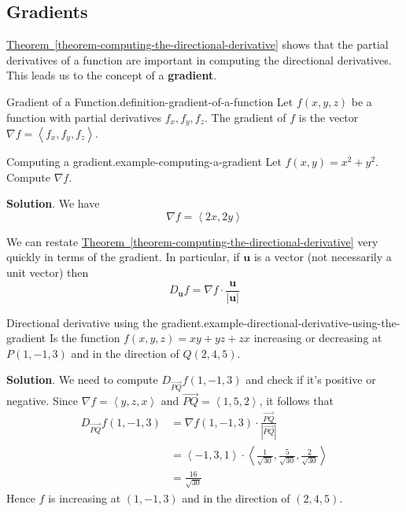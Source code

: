 \documentclass[10pt,]{book}
\newcommand{\terminology}[1]{\textbf{#1}}
\numberwithin{equation}{section}
\newcommand{\vv}[1]{\mathbf{#1}}
\newcommand{\grad}{\nabla}
\newcommand{\dotprod}[1]{\left\langle #1 \right\rangle}
\begin{document}
\subsection[{Gradients}]{Gradients}\label{subsection-gradients}
\hypertarget{p-1404}{}%
\hyperref[theorem-computing-the-directional-derivative]{Theorem~\ref{theorem-computing-the-directional-derivative}} shows that the partial derivatives of a function are important in computing the directional derivatives. This leads us to the concept of a \terminology{gradient}.%
\begin{definition}{Gradient of a Function.}{definition-gradient-of-a-function}%
\hypertarget{p-1405}{}%
Let \(f(x,y,z)\) be a function with partial derivatives \(f_{x}, f_{y}, f_{z}\). The gradient of \(f\) is the vector \(\grad f = \dotprod{f_{x}, f_{y}, f_{z}}\).%
\end{definition}
\begin{example}{Computing a gradient.}{example-computing-a-gradient}%
\hypertarget{p-1406}{}%
Let \(f(x,y) = x^{2} + y^{2}\). Compute \(\grad f\).%
\par\smallskip%
\noindent\textbf{Solution}.\hypertarget{solution-228}{}\quad%
\hypertarget{p-1407}{}%
We have%
\begin{equation*}
\grad f = \dotprod{2x, 2y}
\end{equation*}
%
\end{example}
\hypertarget{p-1408}{}%
We can restate \hyperref[theorem-computing-the-directional-derivative]{Theorem~\ref{theorem-computing-the-directional-derivative}} very quickly in terms of the gradient. In particular, if \(\vv{u}\) is a vector (not necessarily a unit vector) then%
\begin{equation}
D_{\vv{u}}f = \grad f\cdot \frac{\vv{u}}{|\vv{u}|}\label{equation-directional-derivative-gradient}
\end{equation}
%
\begin{example}{Directional derivative using the gradient.}{example-directional-derivative-using-the-gradient}%
\hypertarget{p-1409}{}%
Is the function \(f(x,y,z) = xy + yz + zx\) increasing or decreasing at \(P(1,-1,3)\) and in the direction of \(Q(2,4,5)\).%
\par\smallskip%
\noindent\textbf{Solution}.\hypertarget{solution-229}{}\quad%
\hypertarget{p-1410}{}%
We need to compute \(D_{\vec{PQ}}f(1,-1,3)\) and check if it's positive or negative. Since \(\grad f = \dotprod{y, z, x}\) and \(\vec{PQ} = \dotprod{1,5,2}\), it follows that%
\begin{align*}
D_{\vec{PQ}}f(1,-1,3) & = \grad f (1,-1,3)\cdot\frac{\vec{PQ}}{|\vec{PQ}|} \\
& = \dotprod{-1, 3, 1}\cdot\dotprod{\frac{1}{\sqrt{30}}, \frac{5}{\sqrt{30}}, \frac{2}{\sqrt{30}}} \\
& = \frac{16}{\sqrt{30}} 
\end{align*}
Hence \(f\) is increasing at \((1,-1,3)\) and in the direction of \((2,4,5)\).%
\end{example}
\end{document}
